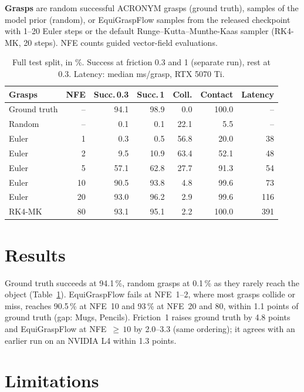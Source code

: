 \documentclass[conference]{IEEEtran}
\begin{document}
\textbf{Grasps} are random successful ACRONYM grasps (ground truth), samples of the model prior
(random), or EquiGraspFlow samples from the released checkpoint with 1--20 Euler steps or the default
Runge--Kutta--Munthe-Kaas sampler (RK4-MK, 20 steps). NFE counts guided vector-field evaluations.

\begin{table}[!t]
  \centering
  \caption{Full test split, in \%. Success at friction 0.3 and 1 (separate run), rest at 0.3.
  Latency: median ms/grasp, RTX 5070 Ti.}
  \label{tab:results}
  \begin{tabular}{@{}lrrrrrr@{}}
    \toprule
    Grasps & NFE & Succ.\,0.3 & Succ.\,1 & Coll. & Contact & Latency \\
    \midrule
    Ground truth & -- & 94.1 & 98.9 & 0.0 & 100.0 & -- \\
    Random & -- & 0.1 & 0.1 & 22.1 & 5.5 & -- \\
    \midrule
    Euler & 1 & 0.3 & 0.5 & 56.8 & 20.0 & 38 \\
    Euler & 2 & 9.5 & 10.9 & 63.4 & 52.1 & 48 \\
    Euler & 5 & 57.1 & 62.8 & 27.7 & 91.3 & 54 \\
    Euler & 10 & 90.5 & 93.8 & 4.8 & 99.6 & 73 \\
    Euler & 20 & 93.0 & 96.2 & 2.9 & 99.6 & 116 \\
    RK4-MK & 80 & 93.1 & 95.1 & 2.2 & 100.0 & 391 \\
    \bottomrule
  \end{tabular}
\end{table}

\section{Results}

Ground truth succeeds at 94.1\,\%, random grasps at 0.1\,\% as they rarely reach the object
(Table~\ref{tab:results}). EquiGraspFlow fails at NFE~1--2, where most grasps collide or miss,
reaches 90.5\,\% at NFE~10 and 93\,\% at NFE~20 and 80, within 1.1 points of ground truth (gap: Mugs,
Pencils). Friction~1 raises ground truth by 4.8 points and EquiGraspFlow at NFE~${\ge}\,10$ by
2.0--3.3 (same ordering); it agrees with an earlier run on an NVIDIA L4 within 1.3 points.

\section{Limitations}
\end{document}

